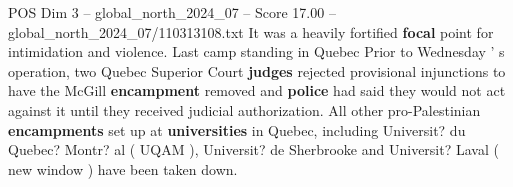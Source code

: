 \begin{textsample}{POS Dim 3 – global\_north\_2024\_07 – Score 17.00 – global\_north\_2024\_07/110313108.txt}
It was a heavily fortified \textbf{focal} point for intimidation and violence.
Last camp standing in Quebec Prior to Wednesday ' s operation, two Quebec Superior Court \textbf{judges} rejected provisional injunctions to have the McGill \textbf{encampment} removed and \textbf{police} had said they would not act against it until they received judicial authorization.
All other pro-Palestinian \textbf{encampments} set up at \textbf{universities} in Quebec, including Universit? du Quebec?
Montr? al ( UQAM ), Universit? de Sherbrooke and Universit?
Laval ( new window ) have been taken down.

\end{textsample}
